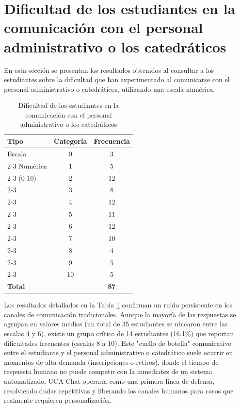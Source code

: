 {{\section{Dificultad de los estudiantes en la comunicación con el personal administrativo o los catedráticos}
En esta sección se presentan los resultados obtenidos al consultar a los estudiantes sobre la dificultad que han experimentado al comunicarse con el personal administrativo o catedráticos, utilizando una escala numérica.

\begin{table}[H]
    \centering
    \caption{Dificultad de los estudiantes en la comunicación con el personal administrativo o los catedráticos}
    \begin{tabular}{|l|c|c|}
        \hline
        \textbf{Tipo} & \textbf{Categoría} & \textbf{Frecuencia} \\ \hline
        Escala & 0 & 3 \\ \cline{2-3} 
        Numérica & 1 & 5 \\ \cline{2-3} 
        (0-10) & 2 & 12 \\ \cline{2-3} 
         & 3 & 8 \\ \cline{2-3} 
         & 4 & 12 \\ \cline{2-3} 
         & 5 & 11 \\ \cline{2-3} 
         & 6 & 12 \\ \cline{2-3} 
         & 7 & 10 \\ \cline{2-3} 
         & 8 & 4 \\ \cline{2-3} 
         & 9 & 5 \\ \cline{2-3} 
         & 10 & 5 \\ \hline
        \textbf{Total} & \multicolumn{1}{c|}{} & \textbf{87} \\ \hline
    \end{tabular}
    \label{tab:dificultad_comunicacion}
\end{table}

Los resultados detallados en la Tabla \ref{tab:dificultad_comunicacion} confirman un ruido persistente en los canales de comunicación tradicionales. Aunque la mayoría de las respuestas se agrupan en valores medios (un total de 35 estudiantes se ubicaron entre las escalas 4 y 6), existe un grupo crítico de 14 estudiantes (16.1\%) que reportan dificultades frecuentes (escalas 8 a 10). Este "cuello de botella" comunicativo entre el estudiante y el personal administrativo o catedrático suele ocurrir en momentos de alta demanda (inscripciones o retiros), donde el tiempo de respuesta humano no puede competir con la inmediatez de un sistema automatizado. UCA Chat operaría como una primera línea de defensa, resolviendo dudas repetitivas y liberando los canales humanos para casos que realmente requieren personalización.

}}
